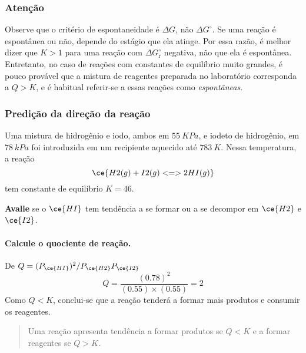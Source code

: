 \begin{warning}

\subsubsection{Atenção}

Observe que o critério de espontaneidade é \(\Delta G\), não \(\Delta G^\circ\). Se uma reação é espontânea ou não, depende do estágio que ela atinge.
Por essa razão, é melhor dizer que \(K > 1\) para uma reação com \(\Delta G_\mathrm{r}^\circ\) negativa, não que ela é espontânea. Entretanto, no caso
de reações com constantes de equilíbrio muito grandes, é pouco provável que a mistura de reagentes preparada no laboratório corresponda a \(Q > K\), e
é habitual referir-se a essas reações como \emph{espontâneas}.

\end{warning}

\begin{example}

\subsubsection{Predição da direção da reação}

Uma mistura de hidrogênio e iodo, ambos em \(\qty{55}{\unit{KPa}}\), e iodeto de hidrogênio, em \(\qty{78}{\unit{kPa}}\) foi introduzida em um
recipiente aquecido até \(\qty{783}{\unit{K}}\). Nessa temperatura, a reação \[
    \ce{ H2(g) + I2(g) <=> 2 HI(g) }
\] tem constante de equilíbrio \(K = \num{46}\).

\textbf{Avalie} se o \(\ce{HI}\) tem tendência a se formar ou a se decompor em \(\ce{H2}\) e \(\ce{I2}\).

\paragraph{Calcule o quociente de reação.}

De \(Q = (P_{\ce{HI}})^2/P_{\ce{H2}}P_{\ce{I2}}\) \[
    Q = \dfrac{ (\num{0,78})^2 }{ (\num{0,55}) \times (\num{0,55}) }
      = \num{2}
\] Como \(Q < K\), conclui-se que a reação tenderá a formar mais produtos e consumir os reagentes.

\end{example}

\begin{quote}
Uma reação apresenta tendência a formar produtos se \(Q < K\) e a formar reagentes se \(Q > K\).
\end{quote}

